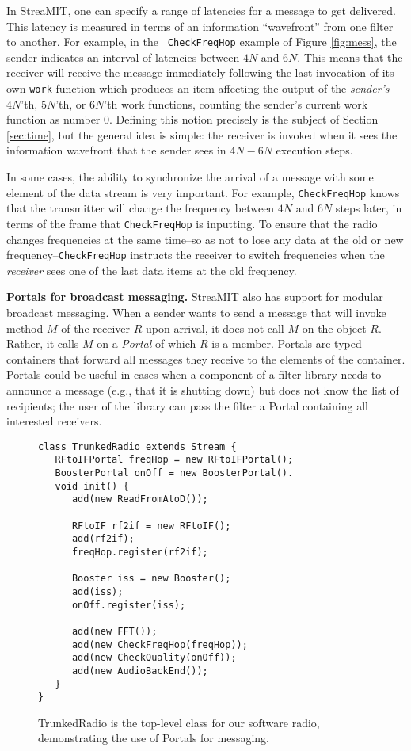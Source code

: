 In StreaMIT, one can specify a range of latencies for a message to get
delivered.  This latency is measured in terms of an information
``wavefront'' from one filter to another.  For example, in the {\tt
CheckFreqHop} example of Figure \ref{fig:mess}, the sender indicates
an interval of latencies between $4N$ and $6N$.  This means that the
receiver will receive the message immediately following the last
invocation of its own {\tt work} function which produces an item
affecting the output of the {\it sender's} $4N$'th, $5N$'th, or
$6N$'th work functions, counting the sender's current work function as
number 0.  Defining this notion precisely is the subject of Section
\ref{sec:time}, but the general idea is simple:  the receiver is
invoked when it sees the information wavefront that the sender sees in
$4N-6N$ execution steps.  

In some cases, the ability to synchronize the arrival of a message
with some element of the data stream is very important.  For example,
{\tt CheckFreqHop} knows that the transmitter will change the
frequency between $4N$ and $6N$ steps later, in terms of the frame
that {\tt CheckFreqHop} is inputting.  To ensure that the radio
changes frequencies at the same time--so as not to lose any data at
the old or new frequency--{\tt CheckFreqHop} instructs the receiver to
switch frequencies when the {\it receiver} sees one of the last data
items at the old frequency.

{\bf Portals for broadcast messaging.}  StreaMIT also has support for
modular broadcast messaging.  When a sender wants to send a message
that will invoke method $M$ of the receiver $R$ upon arrival, it does
not call $M$ on the object $R$.  Rather, it calls $M$ on a {\it
Portal} of which $R$ is a member.  Portals are typed containers that
forward all messages they receive to the elements of the container.
Portals could be useful in cases when a component of a filter library
needs to announce a message (e.g., that it is shutting down) but does
not know the list of recipients; the user of the library can pass the
filter a Portal containing all interested receivers.

\begin{figure}
\scriptsize
\begin{verbatim}
class TrunkedRadio extends Stream {
   RFtoIFPortal freqHop = new RFtoIFPortal();
   BoosterPortal onOff = new BoosterPortal().
   void init() {
      add(new ReadFromAtoD());

      RFtoIF rf2if = new RFtoIF();
      add(rf2if);
      freqHop.register(rf2if);

      Booster iss = new Booster();
      add(iss);
      onOff.register(iss);
 
      add(new FFT());
      add(new CheckFreqHop(freqHop));
      add(new CheckQuality(onOff));
      add(new AudioBackEnd());
   }
}
\end{verbatim}
\vspace{-12pt}
\caption{\protect\small TrunkedRadio is the top-level class for our
      software radio, demonstrating the use of Portals for messaging.
\protect\label{fig:highradiocode}}
\vspace{-12pt}
\end{figure}

